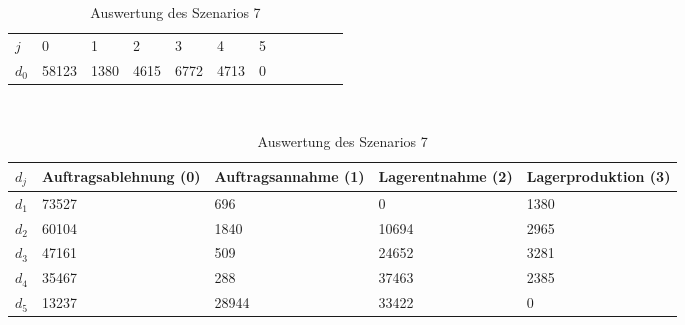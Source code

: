 \begin{table}[h!]
\renewcommand{\arraystretch}{1.5}
  \begin{center}
    \caption{Auswertung des Szenarios 7}  \label{AS7}
    \vspace*{3mm}
    \begin{tabular}{l l l l l l l l l l l l }  \hline 
         $j$ & 0 & 1  & 2 & 3 & 4  & 5   \\  
$d_{0}$ &  58123 &  1380 &  4615 &  6772 &  4713 &  0 \\
\hline
    \end{tabular} \\[3mm]
        \begin{tabular}{ l p{2.5cm} p{2.5cm} p{2.5cm} p{2.5cm} }   \hline    %
    $d_j$ & Auftrags\-ablehnung (0) & Auftrags\-annahme (1)  & Lager\-entnahme (2) & Lager\-produktion (3)\\\hline 
$d_1$ &  73527 &    696 &    0 &  1380 \\
$d_2$ &  60104 &   1840 &  10694 &  2965 \\
$d_3$ &  47161 &    509 &  24652 &  3281 \\
$d_4$ &  35467 &    288 &  37463 &  2385 \\
$d_5$ &  13237 &  28944 &  33422 &   0 \\
          \hline
   \end{tabular} \\[3mm]
     \end{center}
\end{table}



